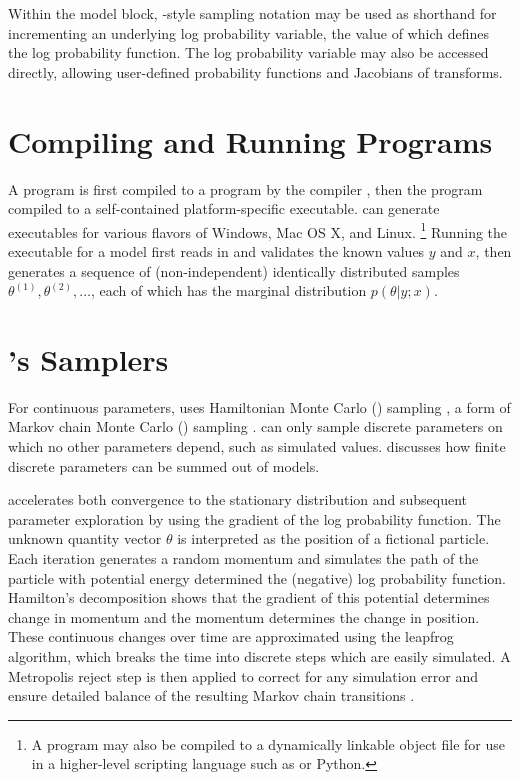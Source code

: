 Within the model block, \BUGS-style sampling notation may be used as
shorthand for incrementing an underlying log probability variable, the
value of which defines the log probability function.  The log
probability variable may also be accessed directly, allowing
user-defined probability functions and Jacobians of transforms.


\section{Compiling and Running \Stan Programs}

A \Stan program is first compiled to a \Cpp program by the \Stan
compiler \stanc, then the \Cpp program compiled to a self-contained
platform-specific executable.  \Stan can generate executables for
various flavors of Windows, Mac OS X, and Linux.%
%
\footnote{A \Stan program may also be compiled to a dynamically
  linkable object file for use in a higher-level scripting language
  such as \R or Python.}
%
Running the \Stan executable for a model first reads in and validates
the known values $y$ and $x$, then generates a sequence of
(non-independent) identically distributed samples $\theta^{(1)},
\theta^{(2)}, \ldots$, each of which has the marginal distribution
$p(\theta|y;x)$.


\section{\Stan's Samplers}

For continuous parameters, \Stan uses Hamiltonian Monte Carlo (\HMC)
sampling \citep{Duane:1987, Neal:1994, Neal:2011}, a form of Markov chain Monte
Carlo (\MCMC) sampling \citep{Metropolis:1953}.   can only sample discrete parameters
on which no other parameters depend, such as simulated values.
 discusses how finite discrete parameters
can be summed out of models.

\HMC accelerates both convergence to the stationary distribution and
subsequent parameter exploration by using the gradient of the log
probability function.  The unknown quantity vector $\theta$ is
interpreted as the position of a fictional particle.  Each iteration
generates a random momentum and simulates the path of the particle
with potential energy determined the (negative) log probability
function.  Hamilton's decomposition shows that the gradient of this
potential determines change in momentum and the momentum determines
the change in position.  These continuous changes over time are
approximated using the leapfrog algorithm, which breaks the time into
discrete steps which are easily simulated.  A Metropolis reject step
is then applied to correct for any simulation error and ensure
detailed balance of the resulting Markov chain transitions
\citep{Metropolis:1953, Hastings:1970}.

